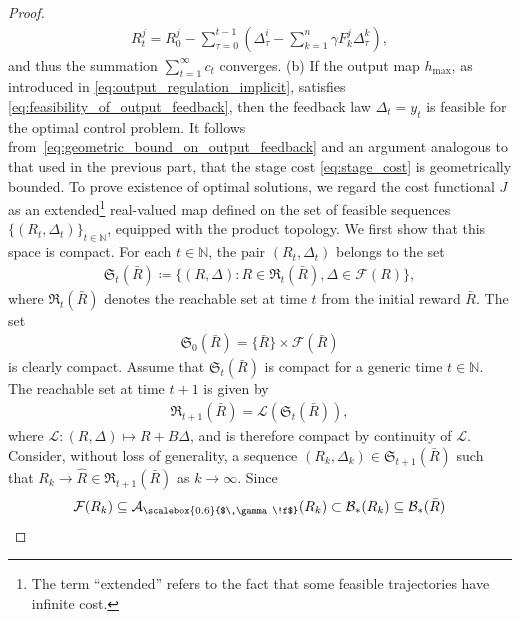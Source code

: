 \documentclass[10pt,leqno]{amsart}
\newcommand{\sml}{\scriptscriptstyle}
\newcommand{\N}{\mathbb{N}}
\newcommand{\Cost}{R}
\newcommand{\f}{f}
\newcommand{\F}{F}
\newcommand{\disc}{\gamma}
\newcommand{\feasset}[1]{\mathcal{A}_{\scalebox{0.6}{$\,\disc\!\f$}}(#1)}
\newcommand{\outmap}{h_{\sml \text{max}}}
\begin{document}
\begin{proof}
    \begin{align*}
        \Cost_t^j = \Cost_0^j - \sum_{\tau = 0}^{t-1} \left(\Delta_\tau^i - \sum_{k = 1}^n \disc \F_k^j \Delta_\tau^k\right),
    \end{align*}
    and thus the summation $\sum_{t = 1}^\infty c_t$ converges.\newline
    (b) If the output map $\outmap$, as introduced in \eqref{eq:output_regulation_implicit}, satisfies \eqref{eq:feasibility_of_output_feedback}, then the feedback law $\Delta_t = y_t$ is feasible for the optimal control problem. It follows from~\eqref{eq:geometric_bound_on_output_feedback} and an argument analogous to that used in the previous part, that the stage cost \eqref{eq:stage_cost} is geometrically bounded.
    \newline To prove existence of optimal solutions, we regard the cost functional $J$ as an extended\footnote{The term ``extended'' refers to the fact that some feasible trajectories have infinite cost.} real-valued map defined on the set of feasible sequences $\{(\Cost_t, \Delta_t)\}_{t \in \N}$, equipped with the product topology. We first show that this space is compact. For each $t \in \N$, the pair $(\Cost_t, \Delta_t)$ belongs to the set
    \begin{align*}
        \mathfrak{S}_t(\bar{\Cost}) \coloneqq \{(\Cost, \Delta) : \Cost \in \mathfrak{R}_t(\bar{\Cost}), \Delta \in \mathcal{F}(\Cost)\},
    \end{align*}
    where $\mathfrak{R}_t(\bar{\Cost})$ denotes the reachable set at time $t$ from the initial reward $\bar{\Cost}$. The set
    \begin{align*}
        \mathfrak{S}_0(\bar{\Cost}) = \{\bar{\Cost}\} \times \mathcal{F}(\bar{\Cost})
    \end{align*}
    is clearly compact. Assume that $\mathfrak{S}_t(\bar{\Cost})$ is compact for a generic time $t \in \N$. The reachable set at time $t + 1$ is given by
    \begin{align*}
        \mathfrak{R}_{t+1}(\bar{\Cost}) = \mathcal{L}(\mathfrak{S}_t(\bar{\Cost})),
    \end{align*}
    where $\mathcal{L} : (\Cost, \Delta) \mapsto R + B \Delta$, and is therefore compact by continuity of $\mathcal{L}$. Consider, without loss of generality, a sequence $(\Cost_k, \Delta_k) \in \mathfrak{S}_{t+1}(\bar{\Cost})$ such that $\Cost_k \to \hat{\Cost} \in \mathfrak{R}_{t+1}(\bar{\Cost})$ as $k \to \infty$. Since
    \begin{align*}
        \mathcal{F}(\Cost_k) \subseteq \feasset{\Cost_k} \subset \mathcal{B}_*(\Cost_k) \subseteq \mathcal{B}_*(\bar{\Cost})

\end{align*}
\end{proof}
\end{document}
